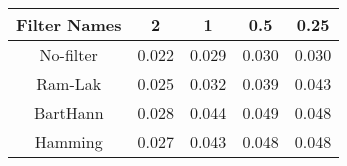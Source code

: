 \begin{tabular}{|c|c|c|c|c|}
\hline 
Filter Names & 2 & 1 & 0.5 & 0.25 \\ 
\hline 
No-filter & 0.022 & 0.029 & 0.030 & 0.030 \\ 
Ram-Lak & 0.025 & 0.032 & 0.039 & 0.043 \\ 
BartHann & 0.028 & 0.044 & 0.049 & 0.048 \\ 
Hamming & 0.027 & 0.043 & 0.048 & 0.048 \\ 
\hline 
\end{tabular}